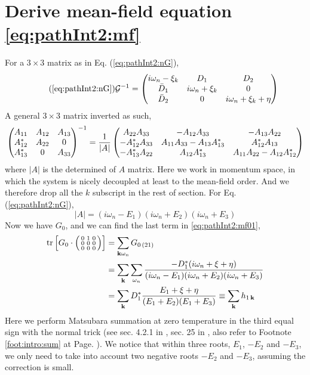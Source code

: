 \section{Derive mean-field equation \ref{eq:pathInt2:mf}\label{sec:pathInt2:deriveMF}}
For a $3\times3$ matrix as in Eq. (\ref{eq:pathInt2:nG}), 
\begin{equation}\tag{\ref{eq:pathInt2:nG}}
\mathcal{G}^{-1}=\begin{pmatrix}
i\omega_{n}-\xi_{k}&D_{1}&D_{2}\\
\bar{D}_{1}&i\omega_{n}+\xi_{k}&0\\
\bar{D}_{2}&0&i\omega_{n}+\xi_{k}+\eta
\end{pmatrix}
\end{equation}
A general $3\times3$ matrix inverted as such, 
  \begin{equation}
  \begin{pmatrix}A_{11}&A_{12}&A_{13}\\A_{12}^{*}&A_{22}&0\\A_{13}^{*}&0&A_{33}\end{pmatrix}^{-1}=
  \frac{1}{|A|}
  \begin{pmatrix}A_{22}A_{33}&-A_{12}A_{33}&-A_{13}A_{22}\\
  	-A_{12}^{*}A_{33}&A_{11}A_{33}-A_{13}A_{13}^{*}&A_{12}^{*}A_{13}\\
	-A_{13}^{*}A_{22}&A_{12}A_{13}^{*}&A_{11}A_{22}-A_{12}A_{12}^{*}\end{pmatrix}
  \end{equation}
where $|A|$ is the determined of $A$ matrix.  Here we work in momentum space, in which the system is nicely decoupled at least to the mean-field order.  And we therefore drop all the $k$ subscript in the rest of section.  For Eq. (\ref{eq:pathInt2:nG}),
\begin{equation}
|A|=(i\omega_{n}-E_{1})(i\omega_{n}+E_{2})(i\omega_{n}+E_{3})
\end{equation}
Now we have $G_{0}$, and we can find the last term in \ref{eq:pathInt2:mf01}, 
\begin{equation}
\begin{split}
\text{tr}\left[{G_{0}}\cdot\left(\begin{smallmatrix}0&1&0\\0&0&0\\0&0&0\end{smallmatrix}\right)\right]&=\sum_{\mathbf{k}\omega_{n}}G_{0\,(21)}\\
&=\sum_{\mathbf{k}}\sum_{\omega_{n}}\frac{-D_{1}^{*}(i\omega_{n}+\xi+\eta)}{(i\omega_{n}-E_{1})(i\omega_{n}+E_{2})(i\omega_{n}+E_{3})}\\
&=\sum_{\mathbf{k}}D_{1}^{*}\frac{E_{1}+\xi+\eta}{(E_{1}+E_{2})(E_{1}+E_{3})}\equiv\sum_{\mathbf{k}}h_{1\,\mathbf{k}}
\end{split}
\end{equation}
Here we perform Matsubara summation at zero temperature in the third equal sign with the normal trick (see sec. 4.2.1 in \cite{Altland}, sec. 25 in \cite{Fetter}, also refer to Footnote \ref{foot:intro:sum} at Page. \pageref{foot:intro:sum}).  We notice that within three roots, $E_{1}$, $-E_{2}$ and $-E_{3}$, we only need to take into account two negative roots $-E_{2}$ and $-E_{3}$, assuming the correction is small. 

